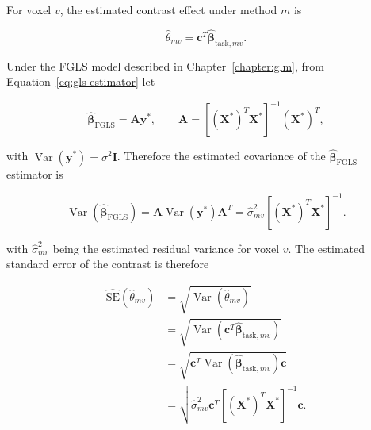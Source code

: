 \documentclass[english]{pwr_wmat_praca_dyplomowa}
\theoremstyle{definition}
\theoremstyle{remark}
\begin{document}
For voxel $v$, the estimated contrast effect under method $m$ is

\begin{equation}
    \widehat{\theta}_{mv}
    = \mathbf{c}^T \widehat{\boldsymbol{\beta}}_{\mathrm{task},mv}.
    \label{eq:contrast-effect}
\end{equation}

\newpage
Under the FGLS model described in Chapter~\ref{chapter:glm}, from Equation~\eqref{eq:gls-estimator} let

\begin{equation}
    \widehat{\boldsymbol{\beta}}_{\mathrm{FGLS}} = \mathbf{A}\mathbf{y}^{\ast}, \qquad
    \mathbf{A} = \left[ \left( \mathbf{X}^{\ast} \right)^T \mathbf{X}^{\ast} \right]^{-1} \left( \mathbf{X}^{\ast} \right)^T,
\end{equation}

with $\operatorname{Var}\left( \mathbf{y}^\ast \right) = \sigma^2 \mathbf{I}$. Therefore the estimated covariance of the $\widehat{\boldsymbol{\beta}}_{\mathrm{FGLS}}$ estimator is

\begin{equation}
    \operatorname{Var} \left( \widehat{\boldsymbol{\beta}}_{\mathrm{FGLS}} \right)
    = \mathbf{A} \operatorname{Var}\left( \mathbf{y}^\ast \right) \mathbf{A}^T 
    = \widehat{\sigma}_{mv}^2 \left[ \left( \mathbf{X}^{\ast} \right)^T \mathbf{X}^{\ast} \right]^{-1}.
\end{equation}

with $\widehat{\sigma}_{mv}^2$ being the estimated residual variance for voxel $v$. The estimated standard error of the contrast is therefore

\begin{equation}
    \begin{aligned}
        \widehat{\mathrm{SE}} \left(\widehat{\theta}_{mv}\right)
        &= \sqrt{\operatorname{Var}\left(\widehat{\theta}_{mv}\right)} \\
        &= \sqrt{\operatorname{Var}\left( \mathbf{c}^T \widehat{\boldsymbol{\beta}}_{\mathrm{task},mv} \right)} \\
        &= \sqrt{\mathbf{c}^T \operatorname{Var}\left(\widehat{\boldsymbol{\beta}}_{\mathrm{task},mv} \right) \mathbf{c}} \\
        &= \sqrt{\widehat{\sigma}_{mv}^2  \mathbf{c}^T \left[ \left( \mathbf{X}^{\ast} \right)^T \mathbf{X}^{\ast} \right]^{-1} \mathbf{c}}.  
    \end{aligned}
    \label{eq:contrast-se}
\end{equation}
\end{document}
